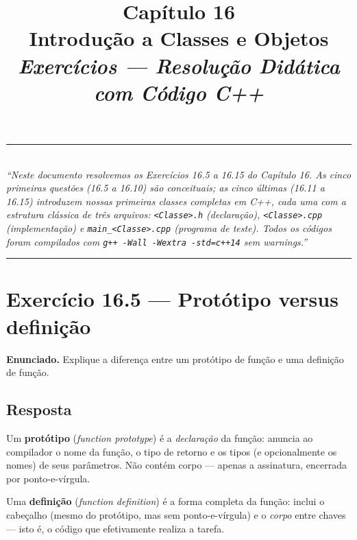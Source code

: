 \documentclass[11pt,a4paper]{article}
\title{
  \vspace{-1cm}
  {\Huge\bfseries\color{deitelblue} Cap\'itulo 16}\\[0.3em]
  {\Large\bfseries Introdu\c{c}\~ao a Classes e Objetos}\\[0.8em]
  {\large\itshape Exerc\'icios --- Resolu\c{c}\~ao Did\'atica com C\'odigo C++}
}
\author{}
\date{}
\begin{document}
\maketitle
\thispagestyle{empty}
\vspace{-2em}

\begin{center}
\rule{0.85\textwidth}{0.5pt}\\[0.4em]
\textit{``Neste documento resolvemos os Exerc\'icios 16.5 a 16.15 do Cap\'itulo 16. As cinco primeiras quest\~oes (16.5 a 16.10) s\~ao conceituais; as cinco \'ultimas (16.11 a 16.15) introduzem nossas primeiras classes completas em C++, cada uma com a estrutura cl\'assica de tr\^es arquivos: \texttt{<Classe>.h} (declara\c{c}\~ao), \texttt{<Classe>.cpp} (implementa\c{c}\~ao) e \texttt{main\_<Classe>.cpp} (programa de teste). Todos os c\'odigos foram compilados com \texttt{g++ -Wall -Wextra -std=c++14} sem warnings.''}\\[0.4em]
\rule{0.85\textwidth}{0.5pt}
\end{center}

\vspace{1em}

\section{Exerc\'icio 16.5 --- Prot\'otipo versus defini\c{c}\~ao}

\begin{enunciado}
\textbf{Enunciado.} Explique a diferen\c{c}a entre um prot\'otipo de fun\c{c}\~ao e uma defini\c{c}\~ao de fun\c{c}\~ao.
\end{enunciado}

\subsection*{Resposta}

Um \textbf{prot\'otipo} (\emph{function prototype}) \'e a \emph{declara\c{c}\~ao} da fun\c{c}\~ao: anuncia ao compilador o nome da fun\c{c}\~ao, o tipo de retorno e os tipos (e opcionalmente os nomes) de seus par\^ametros. N\~ao cont\'em corpo --- apenas a assinatura, encerrada por ponto-e-v\'irgula.

Uma \textbf{defini\c{c}\~ao} (\emph{function definition}) \'e a forma completa da fun\c{c}\~ao: inclui o cabe\c{c}alho (mesmo do prot\'otipo, mas sem ponto-e-v\'irgula) e o \emph{corpo} entre chaves --- isto \'e, o c\'odigo que efetivamente realiza a tarefa.
\end{document}
